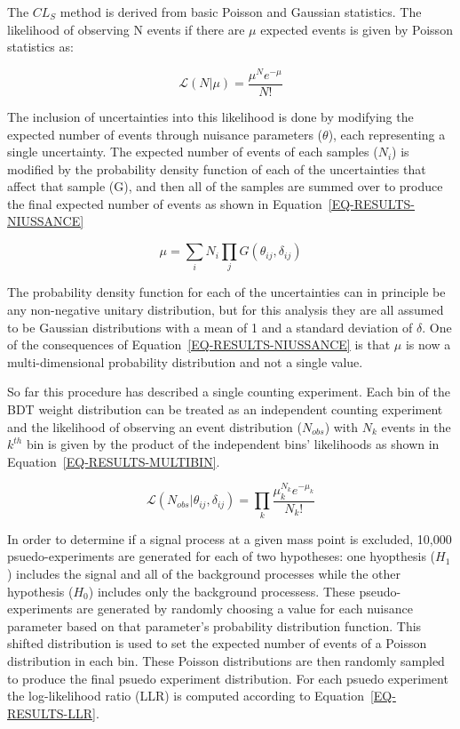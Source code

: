 The $CL_S$ method is derived from basic Poisson and Gaussian statistics. The likelihood of observing N events if there are $\mu$ expected events is given by Poisson statistics as:

\begin{equation}
\label{EQ-RESULTS-POISSON}
\mathcal{L}(N|\mu) = \frac{\mu^{N}e^{-\mu}}{N!}
\end{equation}

The inclusion of uncertainties into this likelihood is done by modifying the expected number of events through nuisance parameters ($\theta$), each representing a single uncertainty. The expected number of events of each samples ($N_i$) is modified by the probability density function of each of the uncertainties that affect that sample (G), and then all of the samples are summed over to produce the final expected number of events as shown in Equation~\ref{EQ-RESULTS-NIUSSANCE}

\begin{equation}
\label{EQ-RESULTS-NIUSSANCE}
\mu = \sum\limits_iN_i\prod\limits_jG(\theta_{ij},\delta_{ij})
\end{equation}

\noindent
The probability density function for each of the uncertainties can in principle be any non-negative unitary distribution, but for this analysis they are all assumed to be Gaussian distributions with a mean of 1 and a standard deviation of $\delta$. One of the consequences of Equation~\ref{EQ-RESULTS-NIUSSANCE} is that $\mu$ is now a multi-dimensional probability distribution and not a single value.

So far this procedure has described a single counting experiment. Each bin of the BDT weight distribution can be treated as an independent counting experiment and the likelihood of observing an event distribution ($N_{obs}$) with $N_k$ events in the $k^{th}$ bin is given by the product of the independent bins' likelihoods as shown in Equation~\ref{EQ-RESULTS-MULTIBIN}.

\begin{equation}
\label{EQ-RESULTS-MULTIBIN}
\mathcal{L}(N_{obs}|\theta_{ij},\delta_{ij}) = \prod\limits_k\frac{\mu_k^{N_k}e^{-\mu_k}}{N_k!}
\end{equation}

In order to determine if a signal process at a given mass point is excluded, 10,000 psuedo-experiments are generated for each of two hypotheses: one hyopthesis ($H_1$) includes the signal and all of the background processes while the other hypothesis ($H_0$) includes only the background processess. These pseudo-experiments are generated by randomly choosing a value for each nuisance parameter based on that parameter's probability distribution function. This shifted distribution is used to set the expected number of events of a Poisson distribution in each bin. These Poisson distributions are then randomly sampled to produce the final psuedo experiment distribution. For each psuedo experiment the log-likelihood ratio (LLR) is computed according to Equation~\ref{EQ-RESULTS-LLR}.

